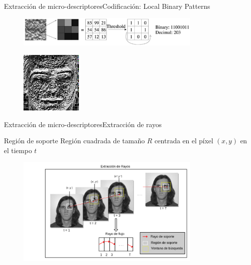 \documentclass{beamer}
\begin{document}
   		\begin{frame}{Extracción de micro-descriptores}{Codificación: Local Binary Patterns}
   			\begin{figure}[bt]
   				\centering
   				\includegraphics[width=9cm]{imagenes/lbp.pdf}
   			\end{figure}	
   			
   			\begin{figure}[bt]
   				\centering
   				\includegraphics[width=3cm]{../Tesis/Figuras/resultados/E1/E1_LBP.png}
   			\end{figure}	  
   		\end{frame}
    
        \begin{frame}{Extracción de micro-descriptores}{Extracción de rayos}
			\begin{block}{Región de soporte}
            		Región cuadrada de tamaño $R$ centrada en el píxel $(x,y)$ en el tiempo $t$
            \end{block}    			
    			
    			\begin{figure}[bt]
        			\centering
                \includegraphics[width=9cm]{imagenes/Extraccion_de_rayos.png}
            \end{figure}        
	        
        \end{frame}
    
\end{document}
